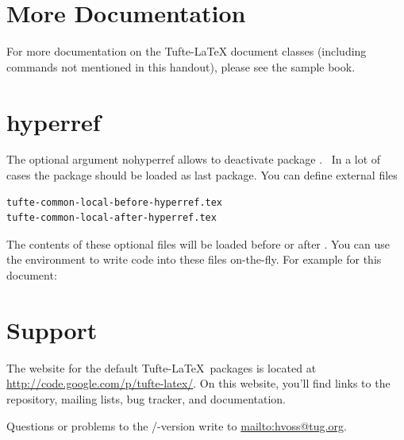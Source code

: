 


\section{More Documentation}\label{sec:more-doc}
For more documentation on the Tufte-\LaTeX{} document classes (including commands not
mentioned in this handout), please see the sample book.

\section{hyperref}\label{sec:hyperref}
The optional argument \textsf{nohyperref} allows to deactivate package 
.~\parencite{ctan-hyperref} In a lot of cases the package
 should be loaded as last package. You can define external files

\begin{verbatim}
tufte-common-local-before-hyperref.tex
tufte-common-local-after-hyperref.tex
\end{verbatim}

The contents of these optional files will be loaded before or after .
You can use the environment  to write code into these files on-the-fly.
For example for this document:


\section{Support}\label{sec:support}

The website for the default Tufte-\LaTeX\ packages is located at
\url{http://code.google.com/p/tufte-latex/}.  On this website, you'll find
links to the  repository, mailing lists, bug tracker, and documentation.

Questions or problems to the \XeLaTeX/\LuaLaTeX-version write to
\url{mailto:hvoss@tug.org}.


\printbibliography

\printindex



